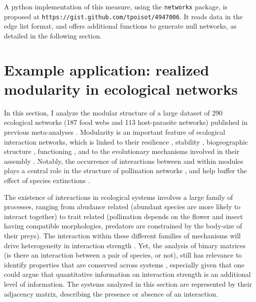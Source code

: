 \documentclass[12pt,oneside]{article}
\begin{document}
A python implementation of this measure, using the \texttt{networkx} package,
is proposed at \texttt{https://gist.github.com/tpoisot/4947006}. It reads data in the edge list
format, and offers additional functions to generate null networks, as detailed
in the following section.

\section{Example application: realized modularity in ecological networks}

In this section, I analyze the modular structure of a large dataset of 290
ecological networks (187 food webs and 113 host-parasite networks) published in
previous meta-analyses \cite{gravel_trophic_2011,poisot_dissimilarity_2012}.
Modularity is an important feature of ecological interaction networks, which is
linked to their resilience
\cite{fortuna_nestedness_2010,stouffer_compartmentalization_2011}, stability
\parencite{thebault_identifying_2012}, biogeographic structure
\cite{flores_multi-scale_2012}, functioning \cite{thebault_food-web_2003}, and
to the evolutionary mechanisms involved in their assembly
\cite{flores_statistical_2011}. Notably, the occurrence of interactions between
and within modules plays a central role in the structure of pollination
networks \parencite{olesen_modularity_2007}, and help buffer the effect of
species extinctions \parencite{stouffer_compartmentalization_2011}.

The existence of interactions in ecological systems involves a large family of
processes, ranging from abudance related
\cite{bluthgen_measuring_2006,canard_emergence_2012} (abundant species are more
likely to interact together) to trait related
\cite{bartomeus_understanding_2013} (pollination depends on the flower and
insect having compatible morphologies, predators are constrained by the
body-size of their preys). The interaction within these different families of
mechanisms will drive heterogeneity in interaction strength
\cite{berlow_quantifying_1999}. Yet, the analysis of binary matrices (is there
an interaction between a pair of species, or not), still has relevance to
identify properties that are conserved across systems
\cite{dunne_network_2006}, especially given that one could argue that
quantitative information on interaction strength is an additional level of
information. The systems analyzed in this section are represented by their
adjacency matrix, describing the presence or absence of an interaction.
\end{document}
